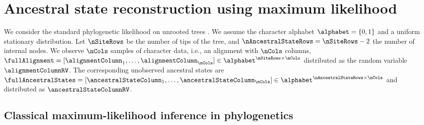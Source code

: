 \section{Ancestral state reconstruction using maximum likelihood}

We consider the standard phylogenetic likelihood on unrooted trees \cite{Felsenstein2004}.
We assume the character alphabet $\alphabet=\{0,1\}$ and a uniform stationary distribution.
Let $\nSiteRows$ be the number of tips of the tree, and $\nAncestralStateRows = \nSiteRows-2$ the number of internal nodes.
We observe $\nCols$ samples of character data, i.e., an alignment with $\nCols$ columns, $\fullAlignment=[\alignmentColumn_1,\ldots,\alignmentColumn_\nCols]\in\alphabet^{\nSiteRows\times\nCols}$ distributed as the random variable $\alignmentColumnRV$.
The corresponding unobserved ancestral states are $\fullAncestralStates=[\ancestralStateColumn_1,\ldots,\ancestralStateColumn_\nCols]\in\alphabet^{\nAncestralStateRows\times\nCols}$ and distributed as $\ancestralStateColumnRV$.

\subsection{Classical maximum-likelihood inference in phylogenetics}

